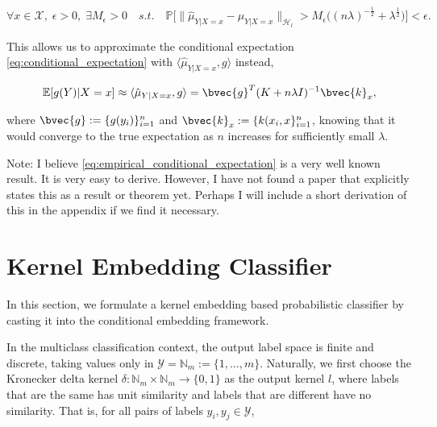 \documentclass{article}
\newcommand{\note}[1]{{\color{orange} #1}}
\begin{document}
	\begin{equation}
		\forall x \in \mathcal{X}, \; \epsilon > 0, \; \exists M_{\epsilon} > 0 \quad s.t. \quad \mathbb{P}\Big[\big\| \hat{\mu}_{Y | X = x} - \mu_{Y | X = x} \big\|_{\mathcal{H}_{l}} > M_{\epsilon} \Big((n \lambda)^{-\frac{1}{2}} + \lambda^{\frac{1}{2}}\Big)\Big] < \epsilon.
	\label{eq:empirical_conditional_embedding_stochastic_convergence}
	\end{equation}

	This allows us to approximate the conditional expectation \eqref{eq:conditional_expectation} with $\langle \hat{\mu}_{Y | X = x}, g \rangle$ instead, 

	\begin{equation}
		\mathbb{E}[g(Y) | X = x] \approx \langle \hat{\mu}_{Y | X = x}, g \rangle = \bvec{g}^{T} (K + n \lambda I)^{-1} \bvec{k}_{x},
	\label{eq:empirical_conditional_expectation}
	\end{equation}
	
	where $\bvec{g} := \{g(y_{i})\}_{i = 1}^{n}$ and $\bvec{k}_{x} := \{k(x_{i}, x\}_{i = 1}^{n}$, knowing that it would converge to the true expectation as $n$ increases for sufficiently small $\lambda$.
	
	\note{Note: I believe \eqref{eq:empirical_conditional_expectation} is a very well known result. It is very easy to derive. However, I have not found a paper that explicitly states this as a result or theorem yet. Perhaps I will include a short derivation of this in the appendix if we find it necessary.}

	
\section{Kernel Embedding Classifier}
\label{sec:kernel_embedding_classifier}

	In this section, we formulate a kernel embedding based probabilistic classifier by casting it into the conditional embedding framework.

	In the multiclass classification context, the output label space is finite and discrete, taking values only in $\mathcal{Y} = \mathbb{N}_{m} := \{1, \dots, m\}$. Naturally, we first choose the Kronecker delta kernel $\delta : \mathbb{N}_{m} \times \mathbb{N}_{m} \to \{0, 1\}$ as the output kernel $l$, where labels that are the same has unit similarity and labels that are different have no similarity. That is, for all pairs of labels $y_{i}, y_{j} \in \mathcal{Y}$,
	
\end{document}
